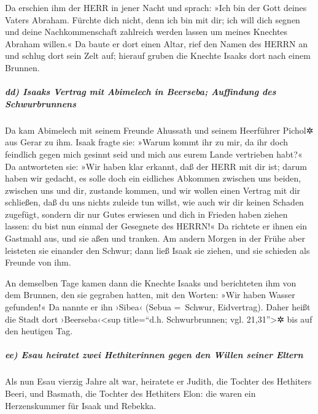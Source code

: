  Da erschien ihm der HERR in jener Nacht und sprach: »Ich
bin der Gott deines Vaters Abraham. Fürchte dich nicht, denn ich bin mit
dir; ich will dich segnen und deine Nachkommenschaft zahlreich werden
lassen um meines Knechtes Abraham willen.«  Da baute er
dort einen Altar, rief den Namen des HERRN an und schlug dort sein Zelt
auf; hierauf gruben die Knechte Isaaks dort nach einem Brunnen.

\hypertarget{dd-isaaks-vertrag-mit-abimelech-in-beerseba-auffindung-des-schwurbrunnens}{%
\subparagraph{dd) Isaaks Vertrag mit Abimelech in Beerseba; Auffindung
des
Schwurbrunnens}\label{dd-isaaks-vertrag-mit-abimelech-in-beerseba-auffindung-des-schwurbrunnens}}

 Da kam Abimelech mit seinem Freunde Ahussath und seinem
Heerführer Pichol✲ aus Gerar zu ihm.  Isaak fragte sie:
»Warum kommt ihr zu mir, da ihr doch feindlich gegen mich gesinnt seid
und mich aus eurem Lande vertrieben habt?«  Da
antworteten sie: »Wir haben klar erkannt, daß der HERR mit dir ist;
darum haben wir gedacht, es solle doch ein eidliches Abkommen zwischen
uns beiden, zwischen uns und dir, zustande kommen, und wir wollen einen
Vertrag mit dir schließen,  daß du uns nichts zuleide tun
willst, wie auch wir dir keinen Schaden zugefügt, sondern dir nur Gutes
erwiesen und dich in Frieden haben ziehen lassen: du bist nun einmal der
Gesegnete des HERRN!«  Da richtete er ihnen ein Gastmahl
aus, und sie aßen und tranken.  Am andern Morgen in der
Frühe aber leisteten sie einander den Schwur; dann ließ Isaak sie
ziehen, und sie schieden als Freunde von ihm.

 An demselben Tage kamen dann die Knechte Isaaks und
berichteten ihm von dem Brunnen, den sie gegraben hatten, mit den
Worten: »Wir haben Wasser gefunden!«  Da nannte er ihn
›Sibea‹ (Sebua =~Schwur, Eidvertrag). Daher heißt die Stadt dort
›Beerseba‹\textless sup title=``d.h. Schwurbrunnen; vgl.
21,31''\textgreater✲ bis auf den heutigen Tag.

\hypertarget{ee-esau-heiratet-zwei-hethiterinnen-gegen-den-willen-seiner-eltern}{%
\subparagraph{ee) Esau heiratet zwei Hethiterinnen gegen den Willen
seiner
Eltern}\label{ee-esau-heiratet-zwei-hethiterinnen-gegen-den-willen-seiner-eltern}}

 Als nun Esau vierzig Jahre alt war, heiratete er Judith,
die Tochter des Hethiters Beeri, und Basmath, die Tochter des Hethiters
Elon:  die waren ein Herzenskummer für Isaak und Rebekka.


